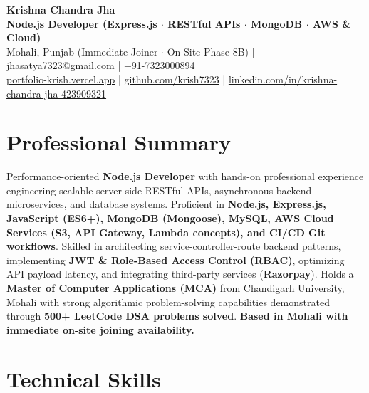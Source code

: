 \documentclass[a4paper,10pt]{article}
\begin{document}
\begin{center}

    {\LARGE \textbf{Krishna Chandra Jha}} \\[2.5pt]

    \textbf{Node.js Developer (Express.js $\cdot$ RESTful APIs $\cdot$ MongoDB $\cdot$ AWS \& Cloud)} \\[3.5pt]

    Mohali, Punjab (Immediate Joiner $\cdot$ On-Site Phase 8B)
    \quad | \quad
    jhasatya7323@gmail.com
    \quad | \quad
    +91-7323000894
    \\[2.5pt]

    \href{https://portfolio-ashen-alpha-dv0whhsamo.vercel.app/}{portfolio-krish.vercel.app}
    \quad | \quad
    \href{https://github.com/krish7323}{github.com/krish7323}
    \quad | \quad
    \href{https://linkedin.com/in/krishna-chandra-jha-423909321}
    {linkedin.com/in/krishna-chandra-jha-423909321}

\end{center}

\section*{Professional Summary}

Performance-oriented \textbf{Node.js Developer} with hands-on professional experience engineering scalable server-side RESTful APIs, asynchronous backend microservices, and database systems. Proficient in \textbf{Node.js, Express.js, JavaScript (ES6+), MongoDB (Mongoose), MySQL, AWS Cloud Services (S3, API Gateway, Lambda concepts), and CI/CD Git workflows}. Skilled in architecting service-controller-route backend patterns, implementing \textbf{JWT \& Role-Based Access Control (RBAC)}, optimizing API payload latency, and integrating third-party services (\textbf{Razorpay}). Holds a \textbf{Master of Computer Applications (MCA)} from Chandigarh University, Mohali with strong algorithmic problem-solving capabilities demonstrated through \textbf{500+ LeetCode DSA problems solved}. \textbf{Based in Mohali with immediate on-site joining availability.}

\section*{Technical Skills}
\end{document}
